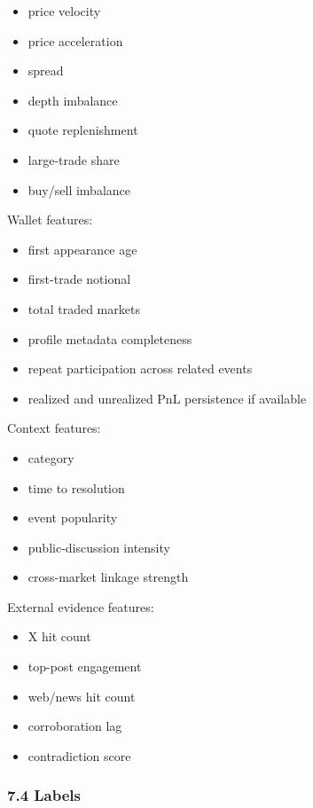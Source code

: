 \documentclass[
]{article}
\providecommand{\tightlist}{%
  \setlength{\itemsep}{0pt}\setlength{\parskip}{0pt}}
\begin{document}
\begin{itemize}
\tightlist
\item
  price velocity
\item
  price acceleration
\item
  spread
\item
  depth imbalance
\item
  quote replenishment
\item
  large-trade share
\item
  buy/sell imbalance
\end{itemize}

Wallet features:

\begin{itemize}
\tightlist
\item
  first appearance age
\item
  first-trade notional
\item
  total traded markets
\item
  profile metadata completeness
\item
  repeat participation across related events
\item
  realized and unrealized PnL persistence if available
\end{itemize}

Context features:

\begin{itemize}
\tightlist
\item
  category
\item
  time to resolution
\item
  event popularity
\item
  public-discussion intensity
\item
  cross-market linkage strength
\end{itemize}

External evidence features:

\begin{itemize}
\tightlist
\item
  X hit count
\item
  top-post engagement
\item
  web/news hit count
\item
  corroboration lag
\item
  contradiction score
\end{itemize}

\subsubsection{7.4 Labels}\label{74-labels}
\end{document}
